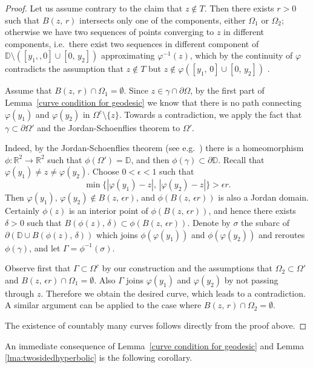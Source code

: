 \documentclass[reqno,11pt]{amsart}
\def\ez{\epsilon}
\numberwithin{equation}{section}
\theoremstyle{remark}
\begin{document}
\begin{proof}
Let us assume contrary to the claim that $z \notin T$. 
Then there exists $r>0$ such that $B(z,\,r)$ intersects
 only one of the components, either $\Omega_1$ or $\Omega_2$; otherwise we have two 
sequences of points converging to $z$ in different components, i.e.\ there exist two sequences in different component of $\mathbb D\setminus ([y_1,
,0]\cup [0,\,y_2])$ approximating $\varphi^{-1}(z)$, which by 
the continuity of $\varphi$
contradicts the assumption that $z \notin T$ but $z\notin \varphi([y_1,\,0]\cup[0,\,y_2])$ . 

Assume that $B(z,\,r)\cap \Omega_1= \emptyset$. 
Since $z\in \gamma\cap \partial \Omega$, by the first part of 
Lemma~\ref{curve condition for geodesic} we know that there is no path 
connecting 
$\varphi(y_1)$ and $\varphi(y_2)$ in
$\Omega^c\setminus \{z\}.$ 
Towards a contradiction, we apply the fact that 
$\gamma\subset \partial \Omega'$ and the 
Jordan-Schoenflies theorem to $\Omega'$. 
 

Indeed, by the Jordan-Schoenflies theorem (see e.g.\ \cite{T1992})  there is a homeomorphism 
$\phi\colon\mathbb R^2\to\mathbb R^2$ such that $\phi(\Omega')=\mathbb D$, 
and then $\phi(\gamma)\subset \partial \mathbb D$. 
Recall that $\varphi(y_1)\neq z \neq \varphi(y_2)$. 
Choose $0<\ez<1$ such that 
$$\min\{|\varphi(y_1)-z|,\,|\varphi(y_2)-z|\}>\ez r.$$ 
Then $\varphi(y_1),\,\varphi(y_2)\notin B(z,\,\ez r)$, and 
$\phi(B(z,\,\ez r))$ is also a Jordan domain. Certainly $\phi(z)$ is an 
interior point of $\phi(B(z,\,\ez r))$, and hence there exists $\delta>0$ 
such that $B(\phi(z),\,\delta)\subset \phi(B(z,\,\ez r))$. 
Denote by $\sigma$ the subarc of 
$\partial\left(\mathbb D\cup B(\phi(z),\,\delta)\right)$ which 
joins $\phi(\varphi(y_1))$ and $\phi(\varphi(y_2))$ and reroutes 
$\phi(\gamma)$, and let $\Gamma=\phi^{-1}(\sigma)$. 


Observe first that $\Gamma\subset\Omega^c$ by our construction and the 
assumptions that $\Omega_2\subset \Omega'$ and 
$B(z,\,\ez r)\cap \Omega_1=\emptyset$. 
Also $\Gamma$ joins $\varphi(y_1)$ and $\varphi(y_2)$ by not passing through 
$z$. Therefore we obtain the desired curve, which leads to a contradiction.
A similar argument can be applied to the case where  $B(z,\,r)\cap \Omega_2= \emptyset$.  

The existence of countably many curves follows directly from the proof above. 
\end{proof}

An immediate consequence of Lemma~\ref{curve condition for geodesic} and 
Lemma \ref{lma:twosidedhyperbolic} is the following corollary.
\end{document}
